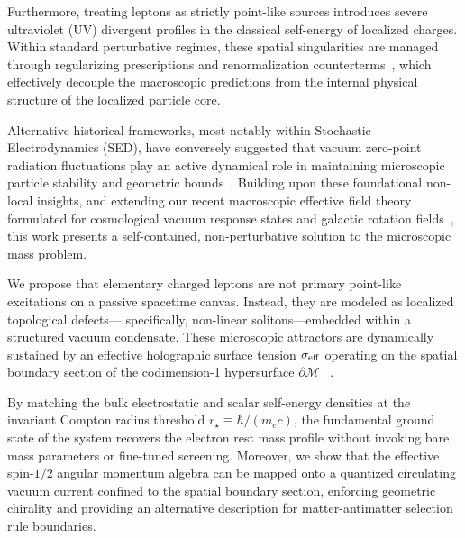 \documentclass[
  reprint,
  aps,
  prd,
  twocolumn,
  superscriptaddress,
  nofootinbib,
  floatfix
]{revtex4-2}
\begin{document}
Furthermore, treating leptons as strictly point-like sources 
introduces severe ultraviolet (UV) divergent profiles in the 
classical self-energy of localized charges. Within standard 
perturbative regimes, these spatial singularities are managed 
through regularizing prescriptions and renormalization 
counterterms~\cite{Feynman1949}, which effectively decouple 
the macroscopic predictions from the internal physical 
structure of the localized particle core.

Alternative historical frameworks, most notably within 
Stochastic Electrodynamics (SED), have conversely 
suggested that vacuum zero-point radiation fluctuations 
play an active dynamical role in maintaining microscopic 
particle stability and geometric bounds~\cite{Boyer1975,
Puthoff1989}. Building upon these foundational non-local 
insights, and extending our recent macroscopic effective field 
theory formulated for cosmological vacuum response states 
and galactic rotation fields~\cite{BuenoParra2026}, this work 
presents a self-contained, non-perturbative solution to the 
microscopic mass problem.

We propose that elementary charged leptons are not primary 
point-like excitations on a passive spacetime canvas. 
Instead, they are modeled as localized topological defects—
specifically, non-linear solitons—embedded within a 
structured vacuum condensate. These microscopic attractors 
are dynamically sustained by an effective holographic surface 
tension $\sigma_{\rm eff}$ operating on the spatial boundary 
section of the codimension-1 hypersurface $\partial\mathcal{M}$
~\cite{tHooft1974,Bekenstein1973}.

By matching the bulk electrostatic and scalar self-energy 
densities at the invariant Compton radius threshold 
$r_\star \equiv \hbar/(m_e c)$, the fundamental ground state 
of the system recovers the electron rest mass profile without 
invoking bare mass parameters or fine-tuned screening. 
Moreover, we show that the effective spin-$1/2$ angular momentum 
algebra can be mapped onto a quantized circulating vacuum 
current confined to the spatial boundary section, enforcing 
geometric chirality and providing an alternative description 
for matter-antimatter selection rule boundaries.
\end{document}
